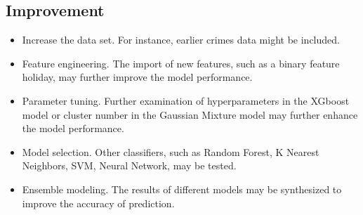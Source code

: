 \documentclass[12pt]{article}
\begin{document}
\subsection{Improvement}
\begin{itemize}
\item Increase the data set. For instance, earlier crimes data might be included.
\item Feature engineering. The import of new features, such as a binary feature holiday, may further improve the model performance.
\item Parameter tuning. Further examination of hyperparameters in the XGboost model or cluster number in the Gaussian Mixture model may further enhance the model performance. 
\item Model selection. Other classifiers, such as Random Forest, K Nearest Neighbors, SVM, Neural Network, may be tested. 
\item Ensemble modeling. The results of different models may be synthesized to improve the accuracy of prediction.
\end{itemize}
\end{document}
